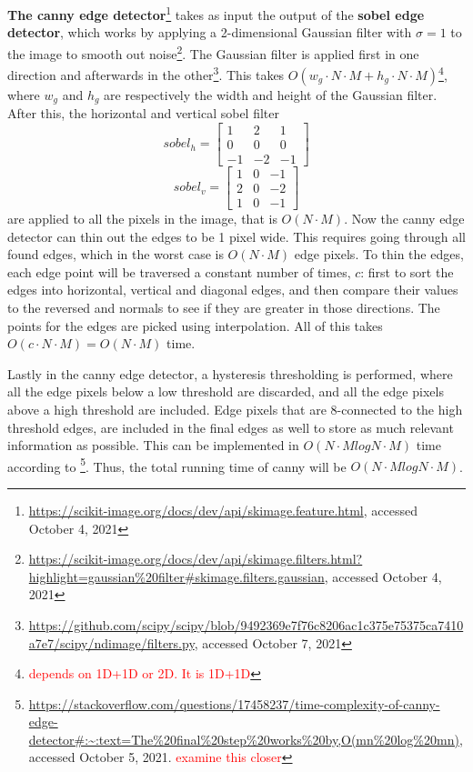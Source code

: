 \textbf{The canny edge detector}\footnote{\url{https://scikit-image.org/docs/dev/api/skimage.feature.html}, accessed October 4, 2021} takes as input the output of the \textbf{sobel edge detector}, which works by applying a 2-dimensional Gaussian filter with $\sigma=1$ to the image to smooth out noise\footnote{\url{https://scikit-image.org/docs/dev/api/skimage.filters.html?highlight=gaussian\%20filter\#skimage.filters.gaussian}, accessed October 4, 2021}. The Gaussian filter is applied first in one direction and afterwards in the other\footnote{\url{https://github.com/scipy/scipy/blob/9492369e7f76c8206ac1c375e75375ca7410a7e7/scipy/ndimage/filters.py}, accessed October 7, 2021}. This takes $O(w_g \cdot N \cdot M + h_g \cdot N \cdot M)$\footnote{\textcolor{red}{depends on 1D+1D or 2D. It is 1D+1D}}, where $w_g$ and $h_g$ are respectively the width and height of the Gaussian filter.\\
After this, the horizontal and vertical sobel filter 
$$sobel_h =
\begin{bmatrix}
 1 &  2 &  1\\
 0 &  0 &  0\\
-1 & -2 & -1
\end{bmatrix}$$
$$sobel_v = 
\begin{bmatrix}
 1 &  0 & -1\\
 2 &  0 & -2\\
 1 &  0 & -1
\end{bmatrix}
$$
are applied to all the pixels in the image, that is $O(N\cdot M)$.
Now the canny edge detector can thin out the edges to be 1 pixel wide. This requires going through all found edges, which in the worst case is $O(N\cdot M)$ edge pixels. To thin the edges, each edge point will be traversed a constant number of times, $c$: first to sort the edges into horizontal, vertical and diagonal edges, and then compare their values to the reversed and normals to see if they are greater in those directions. The points for the edges are picked using interpolation. All of this takes $O(c\cdot N\cdot M) = O(N\cdot M)$ time.

Lastly in the canny edge detector, a hysteresis thresholding is performed, where all the edge pixels below a low threshold are discarded, and all the edge pixels above a high threshold are included. Edge pixels that are 8-connected to the high threshold edges, are included in the final edges as well to store as much relevant information as possible. This can be implemented in $O(N\cdot M log N\cdot M)$ time according to
\footnote{\url{https://stackoverflow.com/questions/17458237/time-complexity-of-canny-edge-detector\#:~:text=The\%20final\%20step\%20works\%20by,O(mn\%20log\%20mn)}, accessed October 5, 2021. \textcolor{red}{examine this closer}}. Thus, the total running time of canny will be $O(N\cdot M log N\cdot M)$.\\

